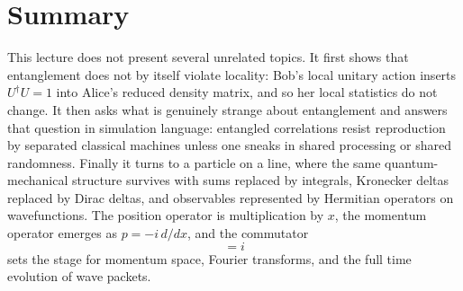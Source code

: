 \section{Summary}

This lecture does not present several unrelated topics. It first shows that entanglement does not by itself violate locality: Bob's local unitary action inserts \(U^\dagger U=1\) into Alice's reduced density matrix, and so her local statistics do not change. It then asks what is genuinely strange about entanglement and answers that question in simulation language: entangled correlations resist reproduction by separated classical machines unless one sneaks in shared processing or shared randomness. Finally it turns to a particle on a line, where the same quantum-mechanical structure survives with sums replaced by integrals, Kronecker deltas replaced by Dirac deltas, and observables represented by Hermitian operators on wavefunctions. The position operator is multiplication by \(x\), the momentum operator emerges as \(p=-i\,d/dx\), and the commutator
\begin{equation}
[x,p]=i
\end{equation}
sets the stage for momentum space, Fourier transforms, and the full time evolution of wave packets.
